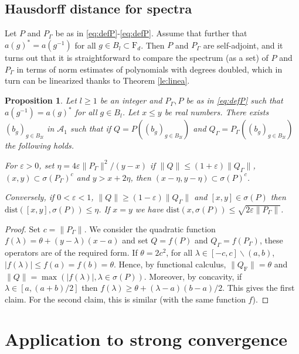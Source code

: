 \documentclass[11pt]{article}
\renewcommand{\star}{{\mathrm{F}}}
\newtheorem{proposition}[lemma]{Proposition}
\newcommand{\cA}{\mathcal{A}}
\newcommand{\dF}{\mathrm{F}}
\newcommand{\1}{1\!\!{\sf I}}
\newcommand{\veps}{\varepsilon}
\begin{document}
\subsection{Hausdorff distance for spectra}

Let $P$ and $P_\Gamma$ be as in \eqref{eq:defP}-\eqref{eq:defP}. Assume that further that $a(g)^* =  a(g^{-1})$ for all $g \in B_l \subset \dF_d$. Then $P$ and $P_\Gamma$ are self-adjoint, and it turns out that it is straightforward to compare the spectrum (as a set) of $P$ and $P_\Gamma$ in terms of norm estimates of polynomials with degrees doubled, which in turn can be linearized thanks to Theorem \ref{le:linea}.

\begin{proposition}
Let $l \geq 1$ be an integer  and $P_\Gamma, P$ be as in \eqref{eq:defP} such that $a(g^{-1}) = a(g)^*$ for all $g \in B_l$. Let $x\leq  y $ be real numbers. There exists $(b_g)_{g \in B_{2l}}$ in $\cA_1$ such that if $Q = P (  (b_g)_{g \in B_{2l}})$ and $Q_\Gamma = P_\Gamma ( (b_g)_{g \in B_{2l}})$ the following holds. 

For $\veps >0$, set $\eta = 4 \veps \| P_\Gamma \|^2 / (y -x)$ if $\| Q \| \leq (1+ \veps) \|Q_\Gamma\|$,  $(x,y) \subset \sigma (P_\Gamma)^c$ and $y > x + 2\eta$, then $(x- \eta,y-\eta ) \subset \sigma(P)^c$.

Conversely, if $0 < \veps < 1$, $\| Q \| \geq (1-  \veps) \|Q_\Gamma\|$ and $[x,y] \in \sigma(P)$ then $\mathrm{dist}([x,y], \sigma (P) ) \leq \eta$. If $x = y$ we have $\mathrm{dist}(x, \sigma (P) )  \leq \sqrt{2 \veps \| P_\Gamma \| }$.  
\end{proposition}

\begin{proof}
Set $c = \|P_\Gamma\|$. We consider the quadratic function $f(\lambda ) = \theta + ( y - \lambda) ( x -a)$ and set $Q = f(P)$ and $Q_\Gamma = f(P_\Gamma)$, these operators are of the required form. If $\theta = 2 c^2$, for all $\lambda  \in [-c,c] \backslash (a,b)$, $|f(\lambda)| \leq f(a) = f(b) = \theta$. Hence, by functional calculus,  $\| Q_\star \| = \theta$ and $\| Q \| = \max (|f(\lambda)|, \lambda \in \sigma(P))$. Moreover, by concavity, if $\lambda \in [a,(a+b)/2]$ then $f(\lambda ) \geq  \theta + (\lambda - a)(b-a)/2 $. This gives the first claim.   For the second claim, this is similar (with the same function $f$).
\end{proof}

\section{Application to strong convergence}
\end{document}
